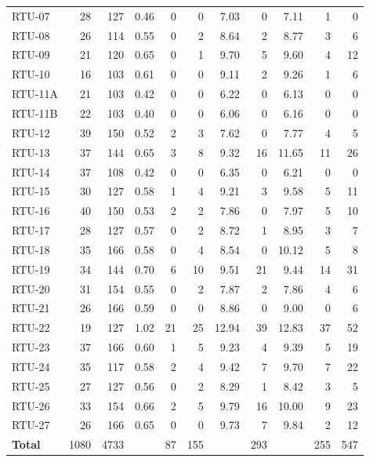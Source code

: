 {\begin{longtable}{lrrrrrrrrrr}
RTU-07 & 28 & 127 & 0.46 & 0 & 0 & 7.03 & 0 & 7.11 & 1 & 0 \\
RTU-08 & 26 & 114 & 0.55 & 0 & 2 & 8.64 & 2 & 8.77 & 3 & 6 \\
RTU-09 & 21 & 120 & 0.65 & 0 & 1 & 9.70 & 5 & 9.60 & 4 & 12 \\
RTU-10 & 16 & 103 & 0.61 & 0 & 0 & 9.11 & 2 & 9.26 & 1 & 6 \\
RTU-11A & 21 & 103 & 0.42 & 0 & 0 & 6.22 & 0 & 6.13 & 0 & 0 \\
RTU-11B & 22 & 103 & 0.40 & 0 & 0 & 6.06 & 0 & 6.16 & 0 & 0 \\
RTU-12 & 39 & 150 & 0.52 & 2 & 3 & 7.62 & 0 & 7.77 & 4 & 5 \\
RTU-13 & 37 & 144 & 0.65 & 3 & 8 & 9.32 & 16 & 11.65 & 11 & 26 \\
RTU-14 & 37 & 108 & 0.42 & 0 & 0 & 6.35 & 0 & 6.21 & 0 & 0 \\
RTU-15 & 30 & 127 & 0.58 & 1 & 4 & 9.21 & 3 & 9.58 & 5 & 11 \\
RTU-16 & 40 & 150 & 0.53 & 2 & 2 & 7.86 & 0 & 7.97 & 5 & 10 \\
RTU-17 & 28 & 127 & 0.57 & 0 & 2 & 8.72 & 1 & 8.95 & 3 & 7 \\
RTU-18 & 35 & 166 & 0.58 & 0 & 4 & 8.54 & 0 & 10.12 & 5 & 8 \\
RTU-19 & 34 & 144 & 0.70 & 6 & 10 & 9.51 & 21 & 9.44 & 14 & 31 \\
RTU-20 & 31 & 154 & 0.55 & 0 & 2 & 7.87 & 2 & 7.86 & 4 & 6 \\
RTU-21 & 26 & 166 & 0.59 & 0 & 0 & 8.86 & 0 & 9.00 & 0 & 6 \\
\rowcolor{dorado!20}RTU-22 & 19 & 127 & 1.02 & 21 & 25 & 12.94 & 39 & 12.83 & 37 & 52 \\
RTU-23 & 37 & 166 & 0.60 & 1 & 5 & 9.23 & 4 & 9.39 & 5 & 19 \\
RTU-24 & 35 & 117 & 0.58 & 2 & 4 & 9.42 & 7 & 9.70 & 7 & 22 \\
RTU-25 & 27 & 127 & 0.56 & 0 & 2 & 8.29 & 1 & 8.42 & 3 & 5 \\
RTU-26 & 33 & 154 & 0.66 & 2 & 5 & 9.79 & 16 & 10.00 & 9 & 23 \\
RTU-27 & 26 & 166 & 0.65 & 0 & 0 & 9.73 & 7 & 9.84 & 2 & 12 \\
\midrule
\textbf{Total} & 1080 & 4733 & & 87 & 155 & & 293 & & 255 & 547 \\
\end{longtable}}
